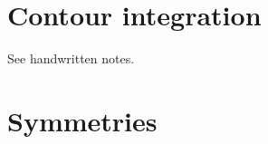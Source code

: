 \documentclass[12pt, oneside]{article}   	%
\theoremstyle{definition}
\begin{document}


\section*{Contour integration}

See handwritten notes.

\section*{Symmetries}
\end{document}
